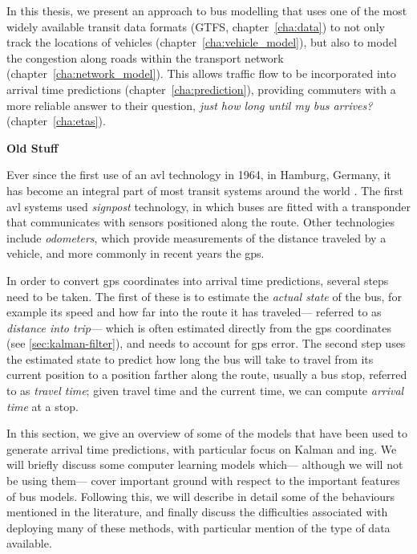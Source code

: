 In this thesis, we present an approach to bus modelling that
uses one of the most widely available transit data formats
(GTFS, chapter~\ref{cha:data})
to not only track the \rt{} locations of vehicles
(chapter~\ref{cha:vehicle_model}),
but also to model the congestion along roads within the transport network
(chapter~\ref{cha:network_model}).
This allows traffic flow to be incorporated into arrival time predictions
(chapter~\ref{cha:prediction}),
providing commuters with a more reliable answer to their question,
\emph{just how long until my bus arrives?}
(chapter~\ref{cha:etas}).



\textbf{Old Stuff}


Ever since the first use of an \gls{avl} technology in 1964, in Hamburg, Germany,
it has become an integral part of most transit systems around the world
\citep{TCRP_1997,TCRP_2003}.
The first \gls{avl} systems used \emph{signpost} technology,
in which buses are fitted with a transponder that communicates with
sensors positioned along the route.
Other technologies include \emph{odometers},
which provide measurements of the distance traveled by a vehicle,
and more commonly in recent years the \gls{gps}.


In order to convert \gls{gps} coordinates into arrival time predictions,
several steps need to be taken.
The first of these is to estimate the \emph{actual state} of the bus,
for example its speed and how far into the route it has traveled---%
referred to as \emph{distance into trip}---%
which is often estimated directly from the \gls{gps} coordinates
(see \cref{sec:kalman-filter}),
and needs to account for \gls{gps} error.
The second step uses the estimated state
to predict how long the bus will take to travel from its current position
to a position farther along the route, usually a bus stop,
referred to as \emph{travel time};
given travel time and the current time,
we can compute \emph{arrival time} at a stop.


In this section, we give an overview of some of the models that have been used
to generate \rt{} arrival time predictions,
with particular focus on Kalman and \pf{}ing.
We will briefly discuss some computer learning models which---%
although we will not be using them---%
cover important ground with respect to the important features of bus models.
Following this, we will describe in detail some of the
behaviours mentioned in the literature,
and finally discuss the difficulties associated with deploying many of these methods,
with particular mention of the type of data available.




